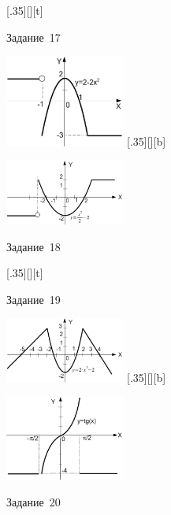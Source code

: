 \begin{figure}[H]
\begin{floatrow}
[.35\textwidth][\FBheight][t]
{\caption{Задание~17}
\label{ch03:refDrawing54}}
{\includegraphics[width=0.35\textwidth,keepaspectratio]{img/ris_3_55}}%
%
[.35\textwidth][\FBheight][b]
{\caption{Задание~18}
\label{ch03:refDrawing55}}
{\includegraphics[width=0.35\textwidth]{img/ris_3_56}}
\end{floatrow}
\end{figure}

\begin{figure}[H]
\begin{floatrow}
[.35\textwidth][\FBheight][t]
{\caption{Задание~19}
\label{ch03:refDrawing56}}
{\includegraphics[width=0.35\textwidth,keepaspectratio]{img/ris_3_57}}%
%
[.35\textwidth][\FBheight][b]
{\caption{Задание~20}
\label{ch03:refDrawing57}}
{\includegraphics[width=0.35\textwidth]{img/ris_3_58}}
\end{floatrow}
\end{figure}

